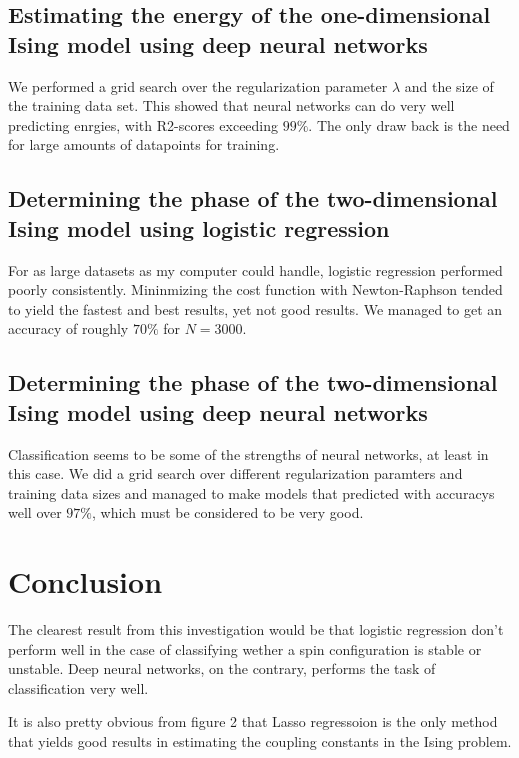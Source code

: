 \documentclass[a4paper,english]{article}
\begin{document}
\subsection{Estimating the energy of the one-dimensional 
Ising model using deep neural networks}
We performed a grid search over the regularization parameter $\lambda$
and the size of the training data set. This showed that 
neural networks can do very well predicting enrgies, 
with R2-scores exceeding $99\%$. The only draw back is the need for 
large amounts of datapoints for training. 

\subsection{Determining the phase of the two-dimensional Ising model using
logistic regression}
For as large datasets as my computer could handle, logistic regression
performed poorly consistently. Mininmizing the cost function with 
Newton-Raphson tended to yield the fastest and best results, yet
not good results. We managed to get an accuracy of roughly $70\%$ 
for $N=3000$. 

\subsection{Determining the phase of the two-dimensional Ising model using
deep neural networks}
Classification seems to be some of the strengths of neural networks, at
least in this case. We did a grid search over different regularization
paramters and training data sizes and managed to make models that
predicted with accuracys well over $97\%$, which must be considered to
be very good.

\section{Conclusion}
The clearest result from this investigation would be that logistic
regression don't perform well in the case of classifying wether a spin
configuration is stable or unstable. Deep neural networks, on the contrary,
performs the task of classification very well.
\par
It is also pretty obvious from figure 2 that Lasso regressoion is the 
only method that yields good results in estimating the coupling constants
in the Ising problem.
{}

\end{document}
